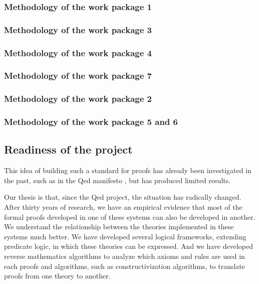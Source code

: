 \subsubsection{Methodology of the work package 1}

\subsubsection{Methodology of the work package 3}

\subsubsection{Methodology of the work package 4}

\subsubsection{Methodology of the work package 7}

\subsubsection{Methodology of the work package 2}

\subsubsection{Methodology of the work package 5 and 6}


\subsection{Readiness of the project}

This idea of building such a standard for proofs has already been
investigated in the past, such as in the Qed manifesto \cite{Qed94}, but
has produced limited results.

Our thesis is that, since the
Qed project, the situation has radically changed. After
thirty years of research, we have an empirical evidence that most of
the formal proofs developed in one of these systems can also be
developed in another. We understand the relationship between the
theories implemented in these systems much better. We have developed
several logical frameworks, extending predicate logic, in which these
theories can be expressed. And we have developed reverse mathematics
algorithms to analyze which axioms and rules are used in each proofs
and algorithms, such as constructivization algorithms, to translate
proofs from one theory to another.



